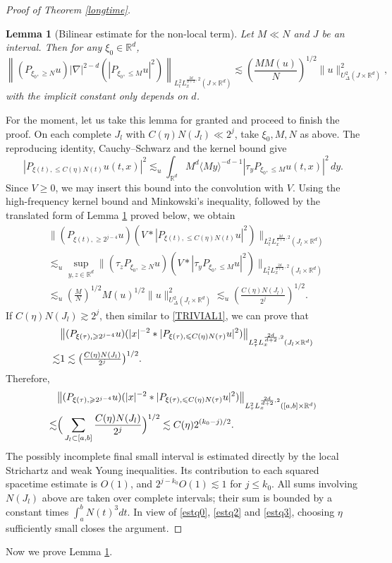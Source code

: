 \documentclass[reqno,11pt]{amsart}
\theoremstyle{plain}
\newtheorem{lemma}[theorem]{Lemma}
\theoremstyle{definition}
\numberwithin{equation}{section}
\numberwithin{theorem}{section}
\def\geq{\geqslant}
\def\leq{\leqslant}
\def\R{\mathbb{R}}
\begin{document}
\begin{proof}[Proof of Theorem \ref{longtime}]
\begin{lemma}[Bilinear estimate for the non-local term]\label{bilinear2}
Let $M\ll N$ and $J$ be an interval. Then for any $\xi_0\in\R^d$,
\[\left\|(P_{\xi_0, \geq N} u)|\nabla|^{2-d}\left(\left|P_{\xi_0, \leq M} u\right|^{2}\right)\right\|_{L_{t}^{2} L_{x}^{\frac{2d}{d+2},2}\left(J \times \mathbb{R}^{d}\right)}\lesssim \left(\frac{MM(u)} {N}\right)^{1/2}\|u\|^2_{U_{\Delta}^2(J\times\R^d)},\]
with the implicit constant only depends on $d$.
\end{lemma}

For the moment, let us take this lemma for granted and proceed to finish
the proof. On each complete $J_l$ with $C(\eta)N(J_l)\ll2^j$, take
$\xi_0,M,N$ as above. The reproducing identity, Cauchy--Schwarz and the
kernel bound give
\[
 |P_{\xi(t),\leq C(\eta)N(t)}u(t,x)|^2
 \lesssim_u\int_{\R^d}M^d\langle My\rangle^{-d-1}
              |\tau_yP_{\xi_0,\leq M}u(t,x)|^2\,dy.
\]
Since $V\geq0$, we may insert this bound into the convolution with $V$.
Using the high-frequency kernel bound and Minkowski's inequality, followed
by the translated form of Lemma \ref{bilinear2} proved below, we obtain
\begin{align*}
 &\big\|(P_{\xi(t),\geq2^{j-4}}u)
          (V*|P_{\xi(t),\leq C(\eta)N(t)}u|^2)\big\|_
             {L_t^2L_x^{\frac{2d}{d+2},2}(J_l\times\R^d)}\\
 &\lesssim_u\sup_{y,z\in\R^d}
       \big\|(\tau_zP_{\xi_0,\geq N}u)
          (V*|\tau_yP_{\xi_0,\leq M}u|^2)\big\|_
             {L_t^2L_x^{\frac{2d}{d+2},2}(J_l\times\R^d)}\\
 &\lesssim_u\left(\frac MN\right)^{1/2}M(u)^{1/2}
                      \|u\|_{U_\Delta^2(J_l\times\R^d)}^2
 \lesssim_u\left(\frac{C(\eta)N(J_l)}{2^j}\right)^{1/2}.
\end{align*}
If $C(\eta)N(J_l)\gtrsim 2^j$, then similar to \eqref{TRIVIAL1}, we can prove that
\begin{align}\notag
 &\big\|(P_{\xi(\tau),\geq 2^{j-4}}u) (|x|^{-2}\ast|P_{\xi(\tau),\leq C(\eta)N(\tau)}u|^2)\big\|_{L_{\tau}^2L_x^{\frac{2d}{d+2},2}(J_l\times\R^d)}\\
 \lesssim&  1\lesssim\big(\tfrac{C(\eta)N(J_l)}{2^j}\big)^{1/2}.
\end{align}
Therefore,
\begin{align}\label{estq3}
&\big\|(P_{\xi(\tau),\geq 2^{j-4}}u) (|x|^{-2}\ast|P_{\xi(\tau),\leq C(\eta)N(\tau)}u|^2)\big\|_{L_{\tau}^2L_x^{\frac{2d}{d+2},2}([a,b]\times\R^d)}\notag\\
\lesssim&\Big(\sum_{J_l\subset[a,b]}\frac{C(\eta)N(J_l)}{2^j}\Big)^{1/2}\lesssim C(\eta)2^{(k_0-j)/2}.
\end{align}
The possibly incomplete final small interval is estimated directly by the local Strichartz and weak Young inequalities. Its contribution to each squared spacetime estimate is $O(1)$, and $2^{j-k_0}O(1)\lesssim1$ for $j\leq k_0$. All sums involving $N(J_l)$ above are taken over complete intervals; their sum is bounded by a constant times $\int_a^bN(t)^3dt$. In view of \eqref{estq0}, \eqref{estq2} and \eqref{estq3}, choosing $\eta$ sufficiently small closes the argument.
\end{proof}
Now we prove Lemma \ref{bilinear2}.
\end{document}
